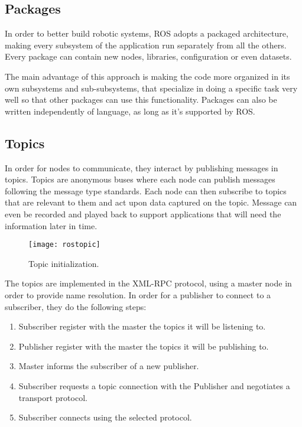 \subsection{Packages}

In order to better build robotic systems, ROS adopts a packaged architecture, making every subsystem of the application run separately from all the others. Every package can contain new nodes, libraries, configuration or even datasets.

The main advantage of this approach is making the code more organized in its own subsystems and sub-subsystems, that specialize in doing a specific task very well so that other packages can use this functionality. Packages can also be written independently of language, as long as it's supported by ROS.

\subsection{Topics}

In order for nodes to communicate, they interact by publishing messages in topics. Topics are anonymous buses where each node can publish messages following the message type standards. Each node can then subscribe to topics that are relevant to them and act upon data captured on the topic. Message can even be recorded and played back to support applications that will need the information later in time.

\begin{figure}[!ht]
\centering
\texttt{[image: rostopic]}
\caption{Topic initialization.}
\label{fig:rostopic}
\end{figure}

The topics are implemented in the XML-RPC protocol, using a master node in order to provide name resolution. In order for a publisher to connect to a subscriber, they do the following steps:

\begin{enumerate}
\item Subscriber register with the master the topics it will be listening to.
\item Publisher register with the master the topics it will be publishing to.
\item Master informs the subscriber of a new publisher.
\item Subscriber requests a topic connection with the Publisher and negotiates a transport protocol.
\item Subscriber connects using the selected protocol.
\end{enumerate}

